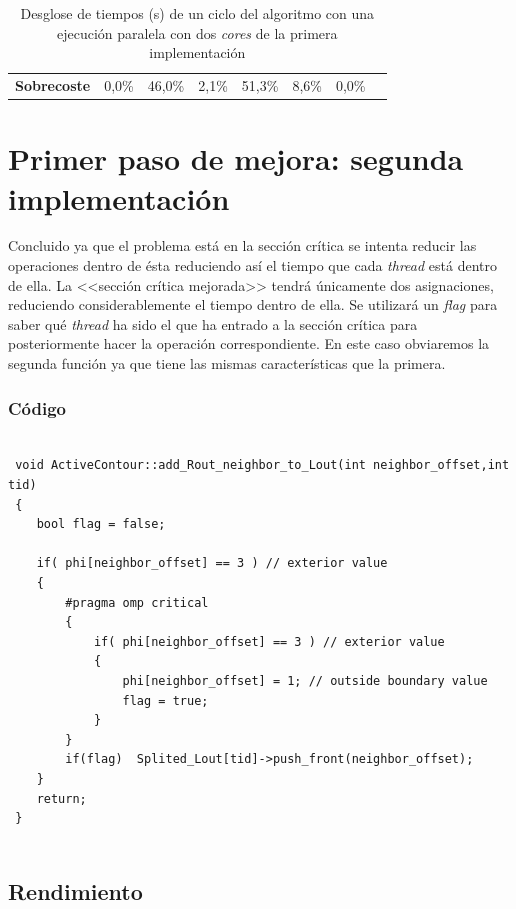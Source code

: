 \begin{table}[H]
\begin{tabular}{c|c|c|c|c|c|c|c}
		\multicolumn{1}{|c|}{{\bf Sobrecoste}}           & 0,0\%                    & 46,0\%         & 2,1\%           & 51,3\%         & 8,6\%            & 0,0\%                                                                 & \multicolumn{1}{l}{}                 \\ \cline{1-7}
	\end{tabular}
	\caption{Desglose de tiempos (s) de un ciclo del algoritmo con una ejecuci\'{o}n paralela con dos \textit{cores} de la primera implementaci\'{o}n}		
	\label{tablaConclusiones1}
\end{table}


\section{Primer paso de mejora: segunda implementaci\'{o}n}

Concluido ya que el problema est\'{a} en la secci\'{o}n cr\'{i}tica se intenta reducir las operaciones dentro de \'{e}sta reduciendo as\'{i} el tiempo que cada \textit{thread} est\'{a} dentro de ella. La <<secci\'{o}n cr\'{i}tica mejorada>> tendr\'{a} \'{u}nicamente dos asignaciones, reduciendo considerablemente el tiempo dentro de ella. Se utilizar\'{a} un \textit{flag} para saber qu\'{e} \textit{thread} ha sido el que ha entrado a la secci\'{o}n cr\'{i}tica para posteriormente hacer la operaci\'{o}n correspondiente. En este caso obviaremos la segunda funci\'{o}n ya que tiene las mismas caracter\'{i}sticas que la primera.

\subsubsection{C\'{o}digo}

\begin{lstlisting}

 void ActiveContour::add_Rout_neighbor_to_Lout(int neighbor_offset,int tid)
 {
 	bool flag = false;
 	
 	if( phi[neighbor_offset] == 3 ) // exterior value
 	{
 		#pragma omp critical
 		{
 			if( phi[neighbor_offset] == 3 ) // exterior value
 			{
 				phi[neighbor_offset] = 1; // outside boundary value
 				flag = true;
 			}
 		}
 		if(flag)  Splited_Lout[tid]->push_front(neighbor_offset);
 	} 	
 	return; 
 }
 	
\end{lstlisting}

\subsection{Rendimiento}

